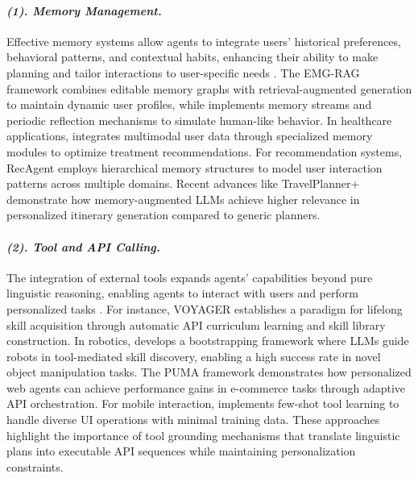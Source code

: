 \paragraph{\textbf{\textit{{(1). Memory Management.}}}}
Effective memory systems allow agents to integrate users' historical preferences, behavioral patterns, and contextual habits, enhancing their ability to make planning and tailor interactions to user-specific needs \cite{wangvoyager,cai2025large,wangmemoryllm}. The EMG-RAG framework \cite{wang2024crafting} combines editable memory graphs with retrieval-augmented generation to maintain dynamic user profiles, while \citet{park2023generative} implements memory streams and periodic reflection mechanisms to simulate human-like behavior. In healthcare applications, \citet{abbasian2023conversational} integrates multimodal user data through specialized memory modules to optimize treatment recommendations. For recommendation systems, RecAgent \cite{wang2023user} employs hierarchical memory structures to model user interaction patterns across multiple domains. Recent advances like TravelPlanner+ \cite{singh2024personal} demonstrate how memory-augmented LLMs achieve higher relevance in personalized itinerary generation compared to generic planners. %

\paragraph{\textbf{\textit{{(2). Tool and API Calling.}}}}
The integration of external tools expands agents' capabilities beyond pure linguistic reasoning, enabling agents to interact with users and perform personalized tasks \cite{cai2025large,zhangbootstrap,xu2024penetrative,wangvoyager,wang2023enabling}. For instance, VOYAGER \cite{wangvoyager} establishes a paradigm for lifelong skill acquisition through automatic API curriculum learning and skill library construction. In robotics, \citet{zhangbootstrap} develops a bootstrapping framework where LLMs guide robots in tool-mediated skill discovery, enabling a high success rate in novel object manipulation tasks. The PUMA framework \cite{cai2025large} demonstrates how personalized web agents can achieve performance gains in e-commerce tasks through adaptive API orchestration. For mobile interaction, \citet{wang2023enabling} implements few-shot tool learning to handle diverse UI operations with minimal training data. These approaches highlight the importance of tool grounding mechanisms \cite{huang2022language} that translate linguistic plans into executable API sequences while maintaining personalization constraints.

